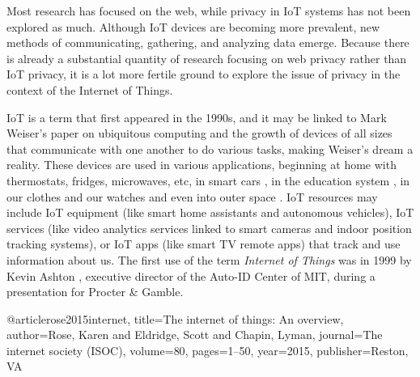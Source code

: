 \documentclass[conference]{IEEEtran}
\begin{document}
Most research has focused on the web, while privacy in IoT systems has not
been explored as much. Although IoT devices are becoming more prevalent,
new methods of communicating, gathering, and analyzing data emerge.
Because there is already a substantial quantity of research focusing on web
privacy rather than IoT privacy, it is a lot more fertile ground to explore
the issue of privacy in the context of the Internet of Things.

IoT is a term that first appeared in the 1990s, and it may be linked to Mark
Weiser's paper on ubiquitous computing \cite{weiser1991computer} and the growth
of devices of all sizes that communicate with one another to do various tasks,
making Weiser's dream a reality. These devices are used in various applications,
beginning at home \cite{marikyan2019systematic} with thermostats, fridges, microwaves,
etc, in smart cars \cite{arena2020overview}, in the education system \cite{al2020survey},
in our clothes and our watches \cite{niknejad2020comprehensive} and even into
outer space \cite{AkyildizInternet}. IoT resources may include IoT equipment
(like smart home assistants and autonomous vehicles), IoT services (like video
analytics services linked to smart cameras and indoor position tracking systems),
or IoT apps (like smart TV remote apps) that track and use information about us.
The first use of the term \textit{Internet of Things} was in 1999 by Kevin
Ashton \cite{KevinThat}, executive director of the Auto-ID Center of MIT,
during a presentation for Procter \& Gamble.


@article{rose2015internet,
  title={The internet of things: An overview},
  author={Rose, Karen and Eldridge, Scott and Chapin, Lyman},
  journal={The internet society (ISOC)},
  volume={80},
  pages={1--50},
  year={2015},
  publisher={Reston, VA}
}
\end{document}
